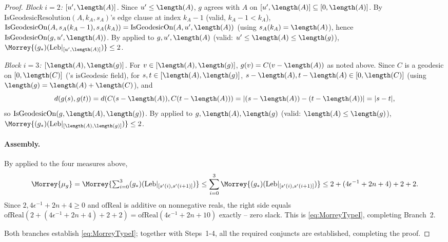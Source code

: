 \begin{proof}
  \emph{Block $i=2$: $[u',\length(A)]$.} Since $u'\le\length(A)$, $g$ agrees with $A$ on
  $[u',\length(A)]\subseteq[0,\length(A)]$. By $\mathrm{IsGeodesicResolution}(A,k_A,s_A)$'s edge
  clause at index $k_A-1$ (valid, $k_A-1<k_A$), $\mathrm{IsGeodesicOn}(A,s_A(k_A-1),s_A(k_A)) =
  \mathrm{IsGeodesicOn}(A,u',\length(A))$ (using $s_A(k_A)=\length(A)$), hence
  $\mathrm{IsGeodesicOn}(g,u',\length(A))$. By  applied to $g,u',
  \length(A)$ (valid: $u'\le\length(A)\le\length(g)$), $\Morrey{(g_*)(\mathrm{Leb}|_{[u',\length(A)]})}
  \le 2$.

  \emph{Block $i=3$: $[\length(A),\length(g)]$.} For $v\in[\length(A),\length(g)]$,
  $g(v)=C(v-\length(A))$ as noted above. Since $C$ is a geodesic on $[0,\length(C)]$
  ('s $\mathrm{isGeodesic}$ field), for $s,t\in[\length(A),\length(g)]$,
  $s-\length(A),t-\length(A)\in[0,\length(C)]$ (using $\length(g)=\length(A)+\length(C)$), and
  \[
    d(g(s),g(t)) = d(C(s-\length(A)),C(t-\length(A))) = |(s-\length(A))-(t-\length(A))| = |s-t|
    ,
  \]
  so $\mathrm{IsGeodesicOn}(g,\length(A),\length(g))$. By  applied to
  $g,\length(A),\length(g)$ (valid: $\length(A)\le\length(g)$),
  $\Morrey{(g_*)(\mathrm{Leb}|_{[\length(A),\length(g)]})}\le2$.

  \paragraph{Assembly.} By  applied to the four measures above,
  \[
    \Morrey{\mu_g} = \Morrey{\textstyle\sum_{i=0}^3 (g_*)(\mathrm{Leb}|_{[s'(i),s'(i+1)]})} \le
    \sum_{i=0}^3 \Morrey{(g_*)(\mathrm{Leb}|_{[s'(i),s'(i+1)]})} \le 2 + (4\epsilon^{-1}+2n+4) + 2 +
    2
    .
  \]
  Since $2,4\epsilon^{-1}+2n+4\ge0$ and $\mathrm{ofReal}$ is additive on nonnegative reals, the
  right side equals $\mathrm{ofReal}(2+(4\epsilon^{-1}+2n+4)+2+2) = \mathrm{ofReal}(4\epsilon^{-1}
  +2n+10)$ exactly -- zero slack. This is \eqref{eq:MorreyTypeI}, completing Branch~2.

  Both branches establish \eqref{eq:MorreyTypeI}; together with Steps~1-4, all the required
  conjuncts are established, completing the proof.
\end{proof}
